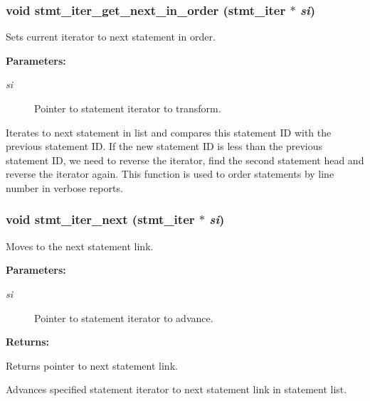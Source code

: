 \subsubsection{\setlength{\rightskip}{0pt plus 5cm}void stmt\_\-iter\_\-get\_\-next\_\-in\_\-order ({\bf stmt\_\-iter} $\ast$ {\em si})}\label{iter_8h_a4}


Sets current iterator to next statement in order.

\begin{Desc}
\item[{\bf Parameters: }]\par
\begin{description}
\item[
{\em si}]Pointer to statement iterator to transform.

\end{description}
\end{Desc}
Iterates to next statement in list and compares this statement ID with the previous statement ID. If the new statement ID is less than the previous statement ID, we need to reverse the iterator, find the second statement head and reverse the iterator again. This function is used to order statements by line number in verbose reports. 
\subsubsection{\setlength{\rightskip}{0pt plus 5cm}void stmt\_\-iter\_\-next ({\bf stmt\_\-iter} $\ast$ {\em si})}\label{iter_8h_a1}


Moves to the next statement link.

\begin{Desc}
\item[{\bf Parameters: }]\par
\begin{description}
\item[
{\em si}]Pointer to statement iterator to advance.

\end{description}
\end{Desc}
\begin{Desc}
\item[{\bf Returns: }]\par
Returns pointer to next statement link.

\end{Desc}
Advances specified statement iterator to next statement link in statement list. 
